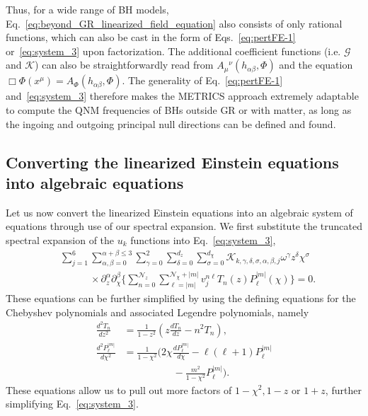 \documentclass[aps,prx,amsmath,floats,floatfix,twocolumn,
  superscriptaddress,nofootinbib,showpacs]{revtex4-1}
\begin{document}
Thus, for a wide range of BH models, Eq.~\eqref{eq:beyond_GR_linearized_field_equation} also consists of only rational functions, which can also be cast in the form of Eqs.~\eqref{eq:pertFE-1} or~\eqref{eq:system_3} upon factorization. 
The additional coefficient functions (i.e. $\mathcal{G}$ and $\mathcal{K}$) can also be straightforwardly read from $A_{\mu}{}^{\nu} (h_{\alpha \beta}, \Phi)$ and the equation $\Box \Phi (x^{\mu}) = A_{\Phi} (h_{\alpha \beta}, \Phi)$.
The generality of Eq.~\eqref{eq:pertFE-1} and~\eqref{eq:system_3} therefore makes the METRICS approach extremely adaptable to compute the QNM frequencies of BHs outside GR or with matter, as long as the ingoing and outgoing principal null directions can be defined and found. 

\subsection{Converting the linearized Einstein equations into algebraic equations}
\label{sec:Conversion}

Let us now convert the linearized Einstein equations into an algebraic system of equations through use of our spectral expansion. We first substitute the truncated spectral expansion of the $u_k$ functions into Eq.~\eqref{eq:system_3}, 
\begin{equation}\label{eq:system_4}
\begin{split}
& \sum_{j=1}^{6} \sum_{\alpha, \beta = 0}^{\alpha + \beta \leq 3} \sum_{\gamma=0}^{2} \sum_{\delta=0}^{d_{z}} \sum_{\sigma=0}^{d_{\chi}} \mathcal{K}_{k, \gamma, \delta, \sigma, \alpha, \beta, j} \omega^\gamma z^{\delta} \chi^{\sigma} \\
& \quad \quad \quad \times \partial_{z}^{\alpha} \partial_{\chi}^{\beta} \Bigg\{\sum_{n=0}^{\mathcal{N}_z} \sum_{\ell=|m|}^{\mathcal{N}_{\chi}+|m|} v_j^{n \ell} T_{n}(z) P^{|m|}_{\ell}(\chi) \Bigg\} = 0.  
\end{split}
\end{equation}
These equations can be further simplified by using the defining equations for the Chebyshev polynomials and associated Legendre polynomials, namely
\begin{equation}
\begin{split}
\frac{d^2 T_n}{d z^2} & = \frac{1}{1-z^2} \left( z \frac{d T_n}{dz} - n^2 T_n \right), \\
\frac{d^2 P_{\ell}^{|m|}}{d \chi^2} & = \frac{1}{1-\chi^2} \Big( 2 \chi \frac{d P_{\ell}^{|m|}}{d \chi} - \ell(\ell+1) P_{\ell}^{|m|} \\
& \quad \quad \quad \quad \quad - \frac{m^2}{1-\chi^2} P_{\ell}^{|m|} \Big). 
\end{split}
\end{equation}
These equations allow us to pull out more factors of $1-\chi^2, 1-z$ or $1+z$, further simplifying Eq.~\eqref{eq:system_3}. 
\end{document}
